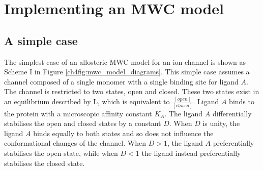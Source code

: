 \section{Implementing an MWC model}

\subsection{A simple case}

The simplest case of an allosteric MWC model for an ion channel is shown as Scheme I in Figure \ref{ch4fig:mwc_model_diagrams}.
This simple case assumes a channel composed of a single monomer with a single binding site for ligand $A$.
The channel is restricted to two states, open and closed.
These two states exist in an equilibrium described by L, which is equivalent to $\frac{[open]}{[closed]}$.
Ligand $A$ binds to the protein with a microscopic affinity constant $K_A$.
The ligand $A$ differentially stabilises the open and closed states by a constant $D$.
When $D$ is unity, the ligand $A$ binds equally to both states and so does not influence the conformational changes of the channel.
When $D>1$, the ligand $A$ preferentially stabilises the open state, while when $D<1$ the ligand instead preferentially stabilises the closed state.

